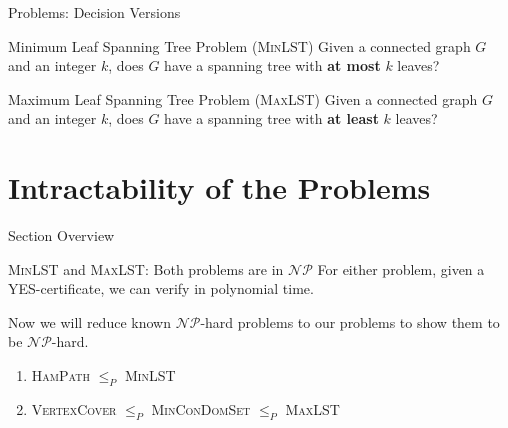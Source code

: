 \documentclass{beamer}
\begin{document}
\begin{frame}{Problems: Decision Versions}

\begin{exampleblock}{Minimum Leaf Spanning Tree Problem \textsc{(MinLST)}}
 Given a connected graph $G$ and an integer $k$, does $G$ have a spanning tree with \textbf{at most} $k$ leaves?
\end{exampleblock}
\vspace{0.7 cm}
\begin{exampleblock}{Maximum Leaf Spanning Tree Problem \textsc{(MaxLST)}}
 Given a connected graph $G$ and an integer $k$, does $G$ have a spanning tree with \textbf{at least} $k$ leaves?
\end{exampleblock}

\end{frame}

\section{Intractability of the Problems}

\begin{frame}{Section Overview}
    \begin{block}{\textsc{MinLST} and \textsc{MaxLST}: Both problems are in $\mathcal{NP}$}
    For either problem, given a YES-certificate, we can verify in polynomial time.
    \end{block} 

    \vspace{0.5 cm}
    Now we will reduce known $\mathcal{NP}$-hard problems to our problems to show them to be $\mathcal{NP}$-hard. 
    \begin{enumerate}
        \item {\textsc{HamPath} $\leq_{P}$ \textsc{MinLST}} 
        \item {\textsc{VertexCover} $\leq_{P}$ \textsc{MinConDomSet} $\leq_{P}$ \textsc{MaxLST}}
    \end{enumerate}
\end{frame}
\end{document}
